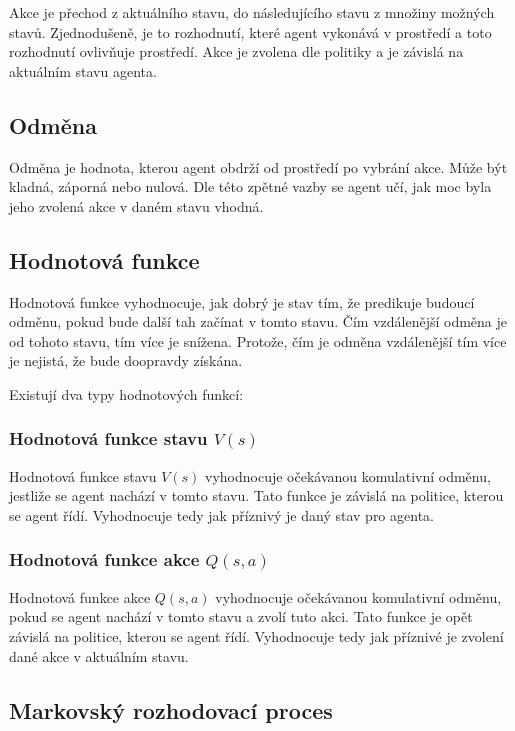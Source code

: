 Akce je přechod z aktuálního stavu, do následujícího stavu z množiny možných stavů.
Zjednodušeně, je to rozhodnutí, které agent vykonává v prostředí a toto rozhodnutí ovlivňuje prostředí.
Akce je zvolena dle politiky a je závislá na aktuálním stavu agenta.
  
\subsection{Odměna}\label{subsec:odmena}

  Odměna je hodnota, kterou agent obdrží od prostředí po vybrání akce.
  Může být kladná, záporná nebo nulová.
  Dle této zpětné vazby se agent učí, jak moc byla jeho zvolená akce v daném stavu vhodná.

\subsection{Hodnotová funkce}\label{subsec:hodnotova-funkce}

  Hodnotová funkce vyhodnocuje, jak dobrý je stav tím, že predikuje budoucí odměnu, pokud bude další tah začínat v tomto stavu.
  Čím vzdálenější odměna je od tohoto stavu, tím více je snížena.
  Protože, čím je odměna vzdálenější tím více je nejistá, že bude doopravdy získána.

  Existují dva typy hodnotových funkcí:

  \subsubsection*{Hodnotová funkce stavu $V(s)$}

  Hodnotová funkce stavu \emph{$V(s)$} vyhodnocuje očekávanou komulativní odměnu, jestliže se agent nachází v tomto stavu.
  Tato funkce je závislá na politice, kterou se agent řídí.
  Vyhodnocuje tedy jak příznivý je daný stav pro agenta.

  \subsubsection*{Hodnotová funkce akce $Q(s, a)$}
  \label{subsubsec:q_function}

  Hodnotová funkce akce \emph{$Q(s, a)$} vyhodnocuje očekávanou komulativní odměnu, pokud se agent nachází v tomto stavu a zvolí tuto akci.
  Tato funkce je opět závislá na politice, kterou se agent řídí.
  Vyhodnocuje tedy jak příznivé je zvolení dané akce v aktuálním stavu.

\subsection{Markovský rozhodovací proces}\label{subsec:markovsky-rozhodovaci-proces}

